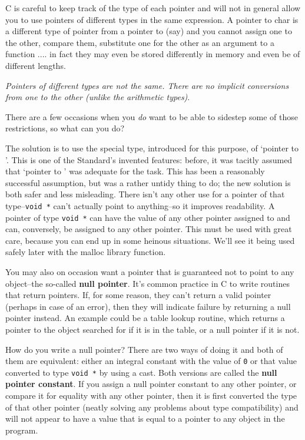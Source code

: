    C is careful to keep track of the type of each pointer and will not in
    general allow you to use pointers of different types in the same
    expression. A pointer to char is a different type of pointer from
    a pointer to \kint{} (say) and you cannot assign one to the
    other, compare them, substitute one for the other as an argument to
    a function .... in fact they may even be stored differently in memory
    and even be of different lengths.


   \textit{Pointers of different types are not the same. There are no
    implicit conversions from one to the other (unlike the arithmetic
    types)}.


   There are a few occasions when you \textit{do} want to be able to
    sidestep some of those restrictions, so what can you do?


   The solution is to use the special type, introduced for this purpose,
    of `pointer to \void{}'. This is one of the Standard's
    invented features: before, it was tacitly assumed that `pointer to
    \kchar' was adequate for the task. This has been
    a reasonably successful assumption, but was a rather untidy thing to do;
    the new solution is both safer and less misleading. There isn't any
    other use for a pointer of that type--\texttt{void *} can't
    actually point to anything--so it improves readability. A pointer of
    type \texttt{void *} can have the value of any other pointer
    assigned to and can, conversely, be assigned to any other pointer. This
    must be used with great care, because you can end up in some heinous
    situations. We'll see it being used safely later with the malloc library
    function.


   You may also on occasion want a pointer that is guaranteed not to
    point to any object--the so-called \textbf{null pointer}. It's
    common practice in C to write routines that return pointers. If, for
    some reason, they can't return a valid pointer (perhaps in case of an
    error), then they will indicate failure by returning a null pointer
    instead. An example could be a table lookup routine, which returns
    a pointer to the object searched for if it is in the table, or a null
    pointer if it is not.


   How do you write a null pointer? There are two ways of doing it and
    both of them are equivalent: either an integral constant with the value
    of \texttt{0} or that value converted to type \texttt{void *} by
    using a cast. Both versions are called the \textbf{null pointer
    constant}. If you assign a null pointer constant to any other
    pointer, or compare it for equality with any other pointer, then it is
    first converted the type of that other pointer (neatly solving any
    problems about type compatibility) and will not appear to have a value
    that is equal to a pointer to any object in the program.


